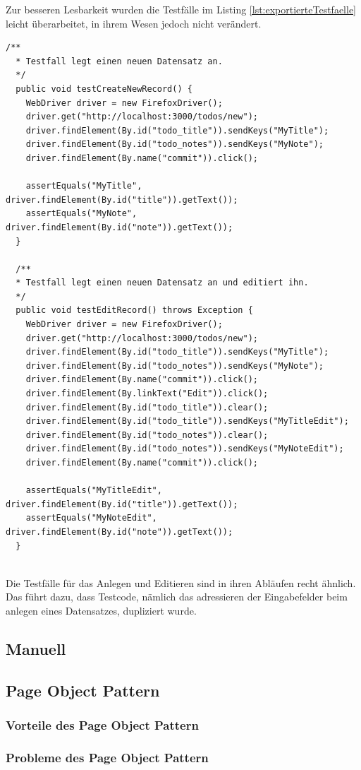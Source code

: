Zur besseren Lesbarkeit wurden die Testfälle im Listing \ref{lst:exportierteTestfaelle} leicht überarbeitet, in ihrem Wesen jedoch nicht verändert.
\begin{lstlisting}[caption={Exportierte Testfälle},label={lst:exportierteTestfaelle}]
  /**
  * Testfall legt einen neuen Datensatz an.
  */
  public void testCreateNewRecord() {
    WebDriver driver = new FirefoxDriver();
    driver.get("http://localhost:3000/todos/new");
    driver.findElement(By.id("todo_title")).sendKeys("MyTitle");
    driver.findElement(By.id("todo_notes")).sendKeys("MyNote");
    driver.findElement(By.name("commit")).click();
  
    assertEquals("MyTitle", driver.findElement(By.id("title")).getText());
    assertEquals("MyNote", driver.findElement(By.id("note")).getText());
  }
  
  /**
  * Testfall legt einen neuen Datensatz an und editiert ihn.
  */
  public void testEditRecord() throws Exception {
    WebDriver driver = new FirefoxDriver();
    driver.get("http://localhost:3000/todos/new");
    driver.findElement(By.id("todo_title")).sendKeys("MyTitle");
    driver.findElement(By.id("todo_notes")).sendKeys("MyNote");
    driver.findElement(By.name("commit")).click();
    driver.findElement(By.linkText("Edit")).click();
    driver.findElement(By.id("todo_title")).clear();
    driver.findElement(By.id("todo_title")).sendKeys("MyTitleEdit");
    driver.findElement(By.id("todo_notes")).clear();
    driver.findElement(By.id("todo_notes")).sendKeys("MyNoteEdit");
    driver.findElement(By.name("commit")).click();
    
    assertEquals("MyTitleEdit", driver.findElement(By.id("title")).getText());
    assertEquals("MyNoteEdit", driver.findElement(By.id("note")).getText());
  }
  
\end{lstlisting}
Die Testfälle für das Anlegen und Editieren sind in ihren Abläufen recht ähnlich. Das führt dazu, dass Testcode, nämlich das adressieren der Eingabefelder beim anlegen eines Datensatzes, dupliziert wurde.

\subsection{Manuell}
\label{sec:manuell}


\subsection{Page Object Pattern}
\label{sec:page_object_pattern}

\subsubsection{Vorteile des Page Object Pattern}
\label{sec:vorteile_des_page_object_pattern}

\subsubsection{Probleme des Page Object Pattern}
\label{sec:probleme_des_page_object_pattern}



